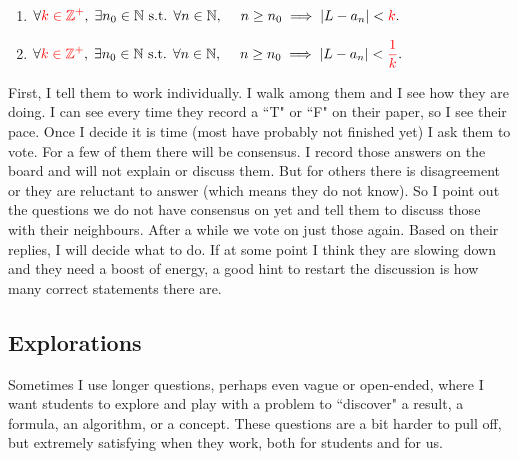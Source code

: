 \documentclass[11pt]{article}
\begin{document}
\begin{example}
\begin{question}
\begin{enumerate}
				\item ${\displaystyle \forall {\color{red} k \in \mathbb{Z}^{+} }, \; \exists n_0 \in \mathbb{N} \text{ s.t. } \forall n \in \mathbb{N}, \; \quad n \geq n_0 \implies |L-a_n| < {\color{red} k}.}$

				\item ${\displaystyle \forall {\color{red} k \in \mathbb{Z}^{+} }, \; \exists n_0 \in \mathbb{N} \text{ s.t. } \forall n \in \mathbb{N}, \; \quad n \geq n_0 \implies |L-a_n| < {\color{red} \frac{1}{k}}.}$
			\end{enumerate}
		\end{question}

		\begin{comments}
			First, I tell them to work individually. I walk among them and I see how they
			are doing. I can see every time they record a ``T" or ``F" on their paper,
			so I see their pace. Once I decide it is time (most have probably not finished
			yet) I ask them to vote. For a few of them there will be consensus. I
			record those answers on the board and will not explain or discuss them. But
			for others there is disagreement or they are reluctant to answer (which
			means they do not know). So I point out the questions we do not have
			consensus on yet and tell them to discuss those with their neighbours. After
			a while we vote on just those again. Based on their replies, I will decide
			what to do. If at some point I think they are slowing down and they need a
			boost of energy, a good hint to restart the discussion is how many correct
			statements there are.
		\end{comments}
	\end{example}

	\newpage

	\subsection{Explorations}

	Sometimes I use longer questions, perhaps even vague or open-ended, where I
	want students to explore and play with a problem to ``discover" a result, a
	formula, an algorithm, or a concept. These questions are a bit harder to pull off,
	but extremely satisfying when they work, both for students and for us.
\end{document}
